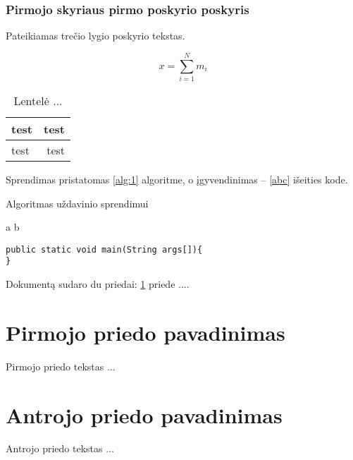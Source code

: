 \documentclass[a4paper,12pt,fleqn]{article}
\begin{document}
\subsubsection{Pirmojo skyriaus pirmo poskyrio poskyris}
\label{sec:data}
Pateikiamas trečio lygio poskyrio tekstas.

\begin{equation}
  x = \sum_{i=1}^N m_i
\end{equation}

\begin{table}[!ht]\centering
  \caption{Lentelė ... }
  \label{tabl:table}
  \begin{tabular}{l|r|}
    test & test \\ \hline
    test & test \\
  \end{tabular}
\end{table}

Sprendimas pristatomas \ref{alg:1} algoritme, o įgyvendinimas -- \ref{abc} išeities kode.

\begin{algorithm}\caption{Algoritmas uždavinio sprendimui}
  \label{alg:1}
  \begin{algorithmic}
    \REQUIRE
    \ENSURE
    \STATE a \AND b
  \end{algorithmic}


\end{algorithm}



\begin{lstlisting}[caption={Pagrindinio metodo žingsniai},label={abc}]
public static void main(String args[]){
}
\end{lstlisting}








\newpage
\begin{appendices}
  Dokumentą sudaro du priedai: \ref{app:a} priede  ....
  \newpage
  \section{Pirmojo priedo pavadinimas}
  \label{app:a}
  Pirmojo priedo tekstas ...

  \newpage
  \section{Antrojo priedo pavadinimas}
  Antrojo priedo tekstas ...

\end{appendices}
\end{document}
